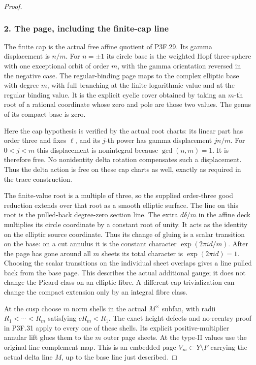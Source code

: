 \begin{proof}
\subsubsection{2. The page, including the finite-cap line}\label{the-page-including-the-finite-cap-line}

The finite cap is the actual free affine quotient of P3F.29. Its gamma displacement is \(n/m\). For \(n=\pm1\) its circle base is the weighted Hopf three-sphere with one exceptional orbit of order \(m\), with the gamma orientation reversed in the negative case. The regular-binding page maps to the complex elliptic base with degree \(m\), with full branching at the finite logarithmic value and at the regular binding value. It is the explicit cyclic cover obtained by taking an \(m\)-th root of a rational coordinate whose zero and pole are those two values. The genus of its compact base is zero.

Here the cap hypothesis is verified by the actual root charts: its linear part has order three and fixes \(\ell\), and its \(j\)-th power has gamma displacement \(jn/m\). For \(0<j<m\) this displacement is nonintegral because \(\gcd(n,m)=1\). It is therefore free. No nonidentity delta rotation compensates such a displacement. Thus the delta action is free on these cap charts as well, exactly as required in the trace construction.

The finite-value root is a multiple of three, so the supplied order-three good reduction extends over that root as a smooth elliptic surface. The line on this root is the pulled-back degree-zero section line. The extra \(d\delta/m\) in the affine deck multiplies its circle coordinate by a constant root of unity. It acts as the identity on the elliptic source coordinate. Thus its change of gluing is a scalar transition on the base: on a cut annulus it is the constant character \(\exp(2\pi i d/m)\). After the page has gone around all \(m\) sheets its total character is \(\exp(2\pi i d)=1\). Choosing the scalar transitions on the individual sheet overlaps gives a line pulled back from the base page. This describes the actual additional gauge; it does not change the Picard class on an elliptic fibre. A different cap trivialization can change the compact extension only by an integral fibre class.

At the cusp choose \(m\) norm shells in the actual \(M^\times\) subfan, with radii \(R_1<\cdots<R_m\) satisfying \(cR_m<R_1\). The exact height defects and no-reentry proof in P3F.31 apply to every one of these shells. Its explicit positive-multiplier annular lift glues them to the \(m\) outer page sheets. At the type-II values use the original line-complement map. This is an embedded page \(V_m\subset Y\setminus F\) carrying the actual delta line \(M\), up to the base line just described.


\end{proof}
